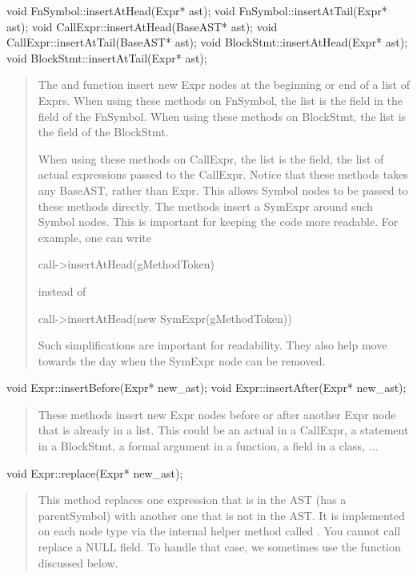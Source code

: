 \documentclass[10pt]{article}
\begin{document}
\begin{clang}
void FnSymbol::insertAtHead(Expr* ast);
void FnSymbol::insertAtTail(Expr* ast);
void CallExpr::insertAtHead(BaseAST* ast);
void CallExpr::insertAtTail(BaseAST* ast);
void BlockStmt::insertAtHead(Expr* ast);
void BlockStmt::insertAtTail(Expr* ast);
\end{clang}
\begin{quote}
The  and  function insert new
Expr nodes at the beginning or end of a list of Exprs.  When using
these methods on FnSymbol, the list is the  field in the
 field of the FnSymbol.  When using these methods
on BlockStmt, the list is the  field of the BlockStmt.

When using these methods on CallExpr, the list is the 
field, the list of actual expressions passed to the CallExpr.  Notice
that these methods takes any BaseAST, rather than Expr.  This allows
Symbol nodes to be passed to these methods directly.  The methods
insert a SymExpr around such Symbol nodes.  This is important for
keeping the code more readable.  For example, one can write
\begin{clang}
call->insertAtHead(gMethodToken)
\end{clang}
instead of
\begin{clang}
call->insertAtHead(new SymExpr(gMethodToken))
\end{clang}
Such simplifications are important for readability.  They also help
move towards the day when the SymExpr node can be removed.
\end{quote}

\begin{clang}
void Expr::insertBefore(Expr* new_ast);
void Expr::insertAfter(Expr* new_ast);
\end{clang}
\begin{quote}
These methods insert new Expr nodes before or after another Expr node
that is already in a list.  This could be an actual in a CallExpr, a
statement in a BlockStmt, a formal argument in a function, a field in
a class, ...
\end{quote}

\begin{clang}
void Expr::replace(Expr* new_ast);
\end{clang}
\begin{quote}
This method replaces one expression that is in the AST (has a
parentSymbol) with another one that is not in the AST.  It is
implemented on each node type via the internal helper method called
.  You cannot call replace a NULL field.  To handle
that case, we sometimes use the  function discussed
below.
\end{quote}
\end{document}
